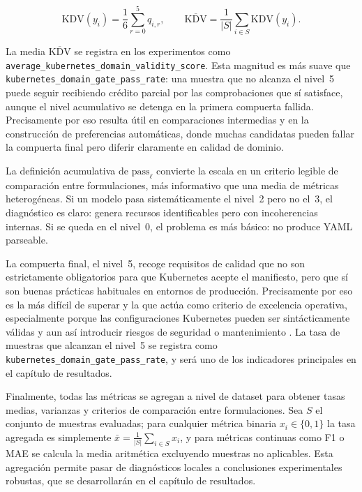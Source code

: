 \[
\mathrm{KDV}(y_i) =
\frac{1}{6}\sum_{r=0}^{5} q_{i,r},
\qquad
\overline{\mathrm{KDV}}
=
\frac{1}{|S|}\sum_{i \in S}\mathrm{KDV}(y_i).
\]

La media \(\overline{\mathrm{KDV}}\) se registra en los experimentos como \texttt{average\_\allowbreak kubernetes\_\allowbreak domain\_\allowbreak validity\_\allowbreak score}.
Esta magnitud es más suave que \texttt{kubernetes\_\allowbreak domain\_\allowbreak gate\_\allowbreak pass\_\allowbreak rate}: una muestra que no alcanza el nivel~5 puede seguir
recibiendo crédito parcial por las comprobaciones que sí satisface, aunque el nivel acumulativo se detenga en la primera compuerta fallida. Precisamente por eso resulta útil en comparaciones
intermedias y en la construcción de preferencias automáticas, donde muchas candidatas pueden fallar la compuerta final pero diferir claramente en calidad de dominio.

La definición acumulativa de \(\mathrm{pass}_{\ell}\) convierte la escala en un criterio legible de comparación
entre formulaciones, más informativo que una media de métricas heterogéneas. Si un modelo pasa sistemáticamente el nivel~2 pero no el~3, el diagnóstico
es claro: genera recursos identificables pero con incoherencias internas. Si se queda en el nivel~0, el problema es más básico: no produce YAML parseable.

La compuerta final, el nivel~5, recoge requisitos de calidad que no son estrictamente obligatorios para que Kubernetes acepte el manifiesto, pero que
sí son buenas prácticas habituales en entornos de producción. Precisamente por eso es la más difícil de superar y la que actúa como criterio de
excelencia operativa, especialmente porque las configuraciones Kubernetes pueden ser sintácticamente válidas y aun así introducir riesgos de seguridad o
mantenimiento \citep{rahman2023securityk8s, zhang2024generativeSmells}. La tasa de muestras que alcanzan el nivel~5 se registra como
\texttt{kubernetes\_\allowbreak domain\_\allowbreak gate\_\allowbreak pass\_\allowbreak rate}, y será
uno de los indicadores principales en el capítulo de resultados.

Finalmente, todas las métricas se agregan a nivel de dataset para obtener tasas medias, varianzas y criterios de comparación entre formulaciones.
Sea $S$ el conjunto de muestras evaluadas; para cualquier métrica binaria $x_i \in \{0,1\}$ la tasa agregada es simplemente
$\bar{x} = \frac{1}{|S|}\sum_{i \in S} x_i$, y para métricas continuas como F1 o MAE se calcula la media aritmética excluyendo muestras
no aplicables. Esta agregación permite pasar de diagnósticos locales a conclusiones experimentales robustas, que se desarrollarán en el capítulo de resultados.
